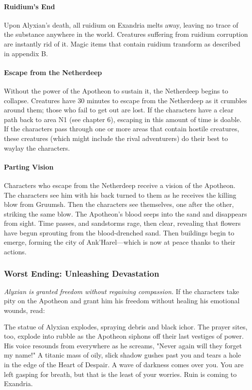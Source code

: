 \documentclass[10pt,a4,twoside,twocolumn,openany,nodeprecatedcode]{dndbook}
\begin{document}
\paragraph{Ruidium's End}
Upon Alyxian's death, all ruidium on Exandria melts away, leaving no trace of the substance anywhere in the world. Creatures suffering from ruidium corruption are instantly rid of it. Magic items that contain ruidium transform as described in appendix B.
\paragraph{Escape from the Netherdeep}
Without the power of the Apotheon to sustain it, the Netherdeep begins to collapse. Creatures have 30 minutes to escape from the Netherdeep as it crumbles around them; those who fail to get out are lost. If the characters have a clear path back to area N1 (see chapter 6), escaping in this amount of time is doable. If the characters pass through one or more areas that contain hostile creatures, these creatures (which might include the rival adventurers) do their best to waylay the characters.
\paragraph{Parting Vision}
Characters who escape from the Netherdeep receive a vision of the Apotheon. The characters see him with his back turned to them as he receives the killing blow from Gruumsh. Then the characters see themselves, one after the other, striking the same blow. The Apotheon's blood seeps into the sand and disappears from sight. Time passes, and sandstorms rage, then clear, revealing that flowers have begun sprouting from the blood-drenched sand. Then buildings begin to emerge, forming the city of Ank'Harel—which is now at peace thanks to their actions.
\subsubsection{Worst Ending: Unleashing Devastation}
\textit{Alyxian is granted freedom without regaining compassion.}
If the characters take pity on the Apotheon and grant him his freedom without healing his emotional wounds, read:
\begin{DndReadAloud}{}
The statue of Alyxian explodes, spraying debris and black ichor. The prayer sites, too, explode into rubble as the Apotheon siphons off their last vestiges of power. His voice resounds from everywhere as he screams, "Never again will they forget my name!" A titanic mass of oily, slick shadow gushes past you and tears a hole in the edge of the Heart of Despair.
A wave of darkness comes over you. You are left gasping for breath, but that is the least of your worries.
Ruin is coming to Exandria.
\end{DndReadAloud}
\end{document}
